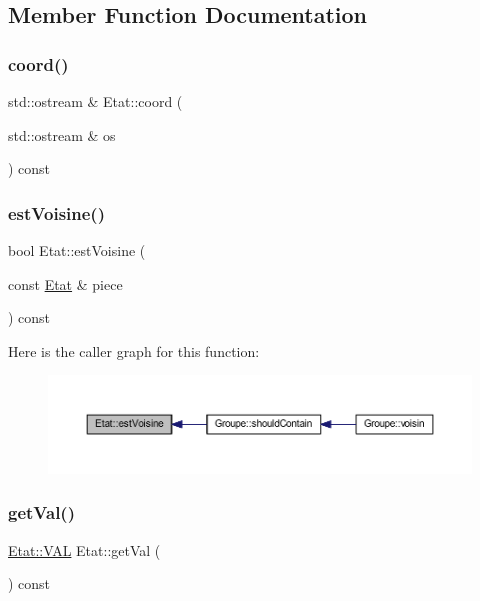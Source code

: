 \subsection{Member Function Documentation}
\mbox{\label{class_etat_a9aa2a1b7274bc6d8a66fbec9655e47d0}} 
\subsubsection{\texorpdfstring{coord()}{coord()}}
{\footnotesize\ttfamily std\+::ostream \& Etat\+::coord (\begin{DoxyParamCaption}\item[{std\+::ostream \&}]{os }\end{DoxyParamCaption}) const}

\mbox{\label{class_etat_ab6e6b44dd68c041150332cee66dc74a3}} 
\subsubsection{\texorpdfstring{est\+Voisine()}{estVoisine()}}
{\footnotesize\ttfamily bool Etat\+::est\+Voisine (\begin{DoxyParamCaption}\item[{const \hyperlink{class_etat}{Etat} \&}]{piece }\end{DoxyParamCaption}) const}

Here is the caller graph for this function\+:
\nopagebreak
\begin{figure}[H]
\begin{center}
\leavevmode
\includegraphics[width=350pt]{class_etat_ab6e6b44dd68c041150332cee66dc74a3_icgraph}
\end{center}
\end{figure}
\mbox{\label{class_etat_ac0b81bbcf64cb3cc574e5a9dcdf94382}} 
\subsubsection{\texorpdfstring{get\+Val()}{getVal()}}
{\footnotesize\ttfamily \hyperlink{class_etat_af3ddb2296ffc379b7f3ad2bf832f294e}{Etat\+::\+V\+AL} Etat\+::get\+Val (\begin{DoxyParamCaption}{ }\end{DoxyParamCaption}) const}

